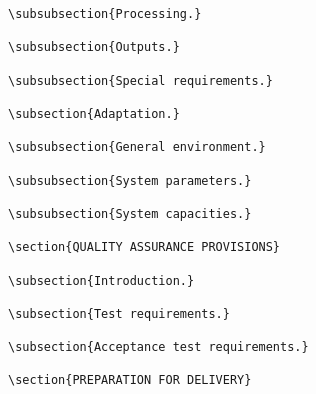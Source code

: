 \begin{itemize}
\begin{small}
\begin{verbatim}
\subsubsection{Processing.}

\subsubsection{Outputs.}

\subsubsection{Special requirements.}

\subsection{Adaptation.}

\subsubsection{General environment.}

\subsubsection{System parameters.}

\subsubsection{System capacities.}

\section{QUALITY ASSURANCE PROVISIONS}

\subsection{Introduction.}

\subsection{Test requirements.}

\subsection{Acceptance test requirements.}

\section{PREPARATION FOR DELIVERY}


\end{verbatim}
\end{small}
\end{itemize}
